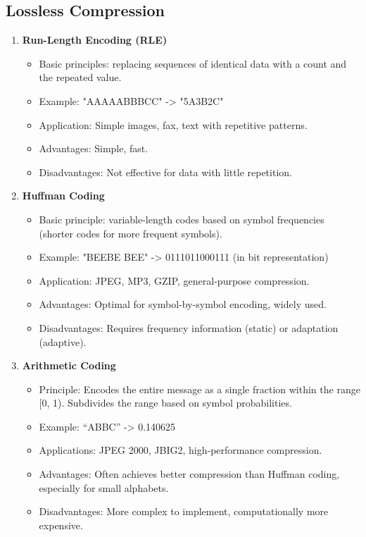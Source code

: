 \subsection{Lossless Compression}
\begin{enumerate}[label=\textbf{\Alph*.}]
    \item \textbf{Run-Length Encoding (RLE)} \begin{itemize}
        \item Basic principles: replacing sequences of identical data with a count and the repeated value.
        \item Example: "AAAAABBBCC" -> "5A3B2C"
        \item Application: Simple images, fax, text with repetitive patterns.
        \item Advantages: Simple, fast.
        \item Disadvantages: Not effective for data with little repetition.
    \end{itemize}
    \item \textbf{Huffman Coding} \begin{itemize}
        \item Basic principle: variable-length codes based on symbol frequencies (shorter codes for more frequent symbols).
        \item Example: "BEEBE BEE" -> 0111011000111 (in bit representation)
        \item Application: JPEG, MP3, GZIP, general-purpose compression.
        \item Advantages: Optimal for symbol-by-symbol encoding, widely used.
        \item Disadvantages: Requires frequency information (static) or adaptation (adaptive).
    \end{itemize}
    \item \textbf{Arithmetic Coding} \begin{itemize}
        \item Principle: Encodes the entire message as a single fraction within the range [0, 1). Subdivides the range based on symbol probabilities.
        \item Example: “ABBC” -> 0.140625
        \item Applications: JPEG 2000, JBIG2, high-performance compression.
        \item Advantages: Often achieves better compression than Huffman coding, especially for small alphabets.
        \item Disadvantages: More complex to implement, computationally more expensive.

\end{itemize}
\end{enumerate}
